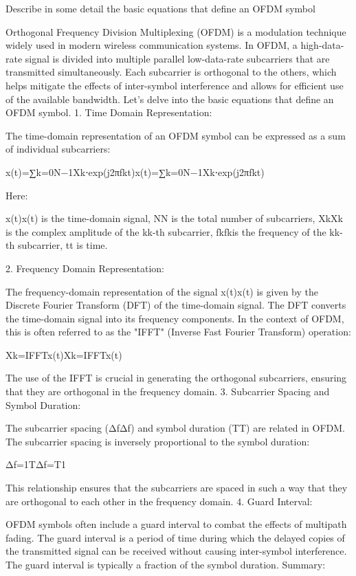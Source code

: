 



Describe in some detail the basic equations that define an OFDM symbol

Orthogonal Frequency Division Multiplexing (OFDM) is a modulation technique widely used in modern wireless communication systems. In OFDM, a high-data-rate signal is divided into multiple parallel low-data-rate subcarriers that are transmitted simultaneously. Each subcarrier is orthogonal to the others, which helps mitigate the effects of inter-symbol interference and allows for efficient use of the available bandwidth. Let's delve into the basic equations that define an OFDM symbol.
1. Time Domain Representation:

The time-domain representation of an OFDM symbol can be expressed as a sum of individual subcarriers:

x(t)=∑k=0N−1Xk⋅exp(j2πfkt)x(t)=∑k=0N−1​Xk​⋅exp(j2πfk​t)

Here:

x(t)x(t) is the time-domain signal,
NN is the total number of subcarriers,
XkXk​ is the complex amplitude of the kk-th subcarrier,
fkfk​ is the frequency of the kk-th subcarrier,
tt is time.

2. Frequency Domain Representation:

The frequency-domain representation of the signal x(t)x(t) is given by the Discrete Fourier Transform (DFT) of the time-domain signal. The DFT converts the time-domain signal into its frequency components. In the context of OFDM, this is often referred to as the "IFFT" (Inverse Fast Fourier Transform) operation:

Xk=IFFT{x(t)}Xk​=IFFT{x(t)}

The use of the IFFT is crucial in generating the orthogonal subcarriers, ensuring that they are orthogonal in the frequency domain.
3. Subcarrier Spacing and Symbol Duration:

The subcarrier spacing (ΔfΔf) and symbol duration (TT) are related in OFDM. The subcarrier spacing is inversely proportional to the symbol duration:

Δf=1TΔf=T1​

This relationship ensures that the subcarriers are spaced in such a way that they are orthogonal to each other in the frequency domain.
4. Guard Interval:

OFDM symbols often include a guard interval to combat the effects of multipath fading. The guard interval is a period of time during which the delayed copies of the transmitted signal can be received without causing inter-symbol interference. The guard interval is typically a fraction of the symbol duration.
Summary:

